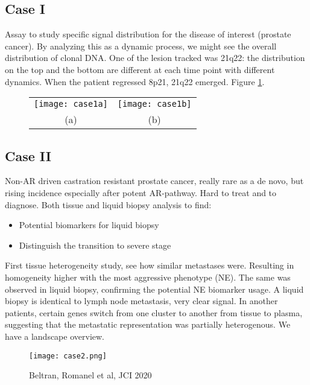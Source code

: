 \subsection{Case I}
Assay to study specific signal distribution for the disease of interest (prostate cancer). By analyzing this as a dynamic process, we might see the overall distribution of clonal DNA.
One of the lesion tracked was 21q22: the distribution on the top and the bottom are different at each time point with different dynamics. When the patient regressed 8p21, 21q22 emerged. Figure \ref{fig:case1}.

\begin{figure}
\begin{tabular}{cc}
  \texttt{[image: case1a]} &\texttt{[image: case1b]} \\
(a)  & (b)  \\
\end{tabular}
\caption{}
\label{fig:case1}
\end{figure}

\subsection{Case II}
Non-AR driven castration resistant prostate cancer, really rare as a de novo, but rising incidence especially after potent AR-pathway. Hard to treat and to diagnose.
Both tissue and liquid biopsy analysis to find:
\begin{itemize}
\item Potential biomarkers for liquid biopsy
\item Distinguish the transition to severe stage
\end{itemize}

First tissue heterogeneity study, see how similar metastases were. Resulting in homogeneity higher with the most aggressive phenotype (NE). The same was observed in liquid biopsy, confirming the potential NE biomarker usage. A liquid biopsy is identical to lymph node metastasis, very clear signal. In another patients, certain genes switch from one cluster to another from tissue to plasma, suggesting that the metastatic representation was partially heterogenous. We have a landscape overview.

\begin{figure}[H]
\centering
    \texttt{[image: case2.png]}
    \caption{\label{fig:case2}Beltran, Romanel et al, JCI 2020}
\end{figure}

